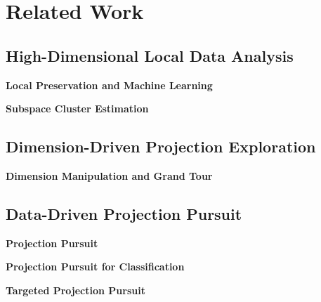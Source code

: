 \section{Related Work}
\label{section:relatedwork}

\subsection{High-Dimensional Local Data Analysis}
\textbf{Local Preservation and Machine Learning}
~\cite{DBLP:journals/cg/MartinsCMT14}~\cite{DBLP:journals/cgf/LiuWBP14}~\cite{DBLP:journals/tvcg/StahnkeDMT16}

\textbf{Subspace Cluster Estimation}
~\cite{DBLP:conf/ieeevast/NamHMZI07}~\cite{DBLP:journals/tsp/CarterRH10}~\cite{DBLP:conf/ieeevast/Kandogan12}~\cite{DBLP:conf/ieeevast/TatuMFBSSK12}~\cite{DBLP:journals/tvcg/YuanRWG13}~\cite{DBLP:journals/cgf/LiuWTBP15}

\subsection{Dimension-Driven Projection Exploration}
\textbf{Dimension Manipulation and Grand Tour}
~\cite{DBLP:journals/tvcg/NamM13}~\cite{DBLP:journals/tvcg/LehmannT13}~\cite{DBLP:journals/cgf/JeongZFRC09}

\subsection{Data-Driven Projection Pursuit}
\textbf{Projection Pursuit}
~\cite{DBLP:journals/tc/FriedmanT74}~\cite{cook1995grand}~\cite{DBLP:journals/ivs/SeoS05}~\cite{DBLP:journals/tvcg/JohanssonJ09}~\cite{DBLP:conf/apvis/NhonW14}

\textbf{Projection Pursuit for Classification}
~\cite{DBLP:journals/cgf/SipsNLH09}~\cite{DBLP:conf/ieeevast/ChooLKP10}~\cite{DBLP:conf/ieeevast/TatuAESTMK09}~\cite{DBLP:journals/cgf/SedlmairTMT12}~\cite{DBLP:conf/ieeevast/AlbuquerqueEM11}

\textbf{Targeted Projection Pursuit}
~\cite{DBLP:journals/tvcg/JoiaCCPN11}~\cite{DBLP:conf/ieeevast/BrownLBC12}~\cite{DBLP:journals/tvcg/Gleicher13}~\cite{DBLP:journals/tvcg/HuBMHNL13}